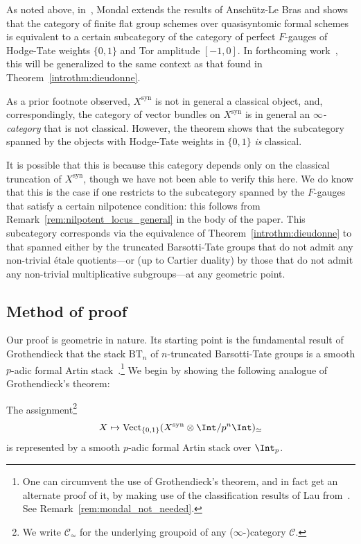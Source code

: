 \documentclass[10pt]{amsart}
\begin{document}
\begin{introrem}
As noted above, in~\cite{Mondal2024-cy}, Mondal extends the results of Ansch\"utz-Le Bras and shows that the category of finite flat group schemes over quasisyntomic formal schemes is equivalent to a certain subcategory of the category of perfect $F$-gauges of Hodge-Tate weights $\{0,1\}$ and Tor amplitude $[-1,0]$. In forthcoming work~\cite{madapusi_mondal}, this will be generalized to the same context as that found in Theorem~\ref{introthm:dieudonne}.
\end{introrem}

\begin{introrem}
As a prior footnote observed, $X^{\mathrm{syn}}$ is not in general a classical object, and, correspondingly, the category of vector bundles on $X^{\mathrm{syn}}$ is in general an \emph{$\infty$-category} that is not classical. However, the theorem shows that the subcategory spanned by the objects with Hodge-Tate weights in $\{0,1\}$ \emph{is} classical. 

It is possible that this is because this category depends only on the classical truncation of $X^{\mathrm{syn}}$, though we have not been able to verify this here. We do know that this is the case if one restricts to the subcategory spanned by the $F$-gauges that satisfy a certain nilpotence condition: this follows from Remark~\ref{rem:nilpotent_locus_general} in the body of the paper. This subcategory corresponds via the equivalence of Theorem~\ref{introthm:dieudonne} to that spanned either by the truncated Barsotti-Tate groups that do not admit any non-trivial \'etale quotients---or (up to Cartier duality) by those that do not admit any non-trivial multiplicative subgroups---at any geometric point.
\end{introrem}



\subsection{Method of proof}

Our proof is geometric in nature. Its starting point is the fundamental result of Grothendieck that the stack $\mathrm{BT}_n$ of $n$-truncated Barsotti-Tate groups is a smooth $p$-adic formal Artin stack~\cite{MR0801922}.\footnote{One can circumvent the use of Grothendieck's theorem, and in fact get an alternate proof of it, by making use of the classification results of Lau from~\cite{lau2018divided}. See Remark~\ref{rem:mondal_not_needed}.} We begin by showing the following analogue of Grothendieck's theorem:
\begin{introthm}
\label{introthm:vect_repble}
The assignment\footnote{We write $\mathcal{C}_\simeq$ for the underlying groupoid of any ($\infty$-)category $\mathcal{C}$.}
\[
X\mapsto \mathrm{Vect}_{\{0,1\}}(X^{\mathrm{syn}}\otimes\Int/p^n\Int)_{\simeq}
\]
is represented by a smooth $p$-adic formal Artin stack over $\Int_p$.
\end{introthm}
\end{document}
